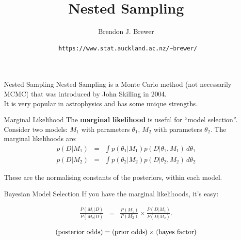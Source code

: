 \documentclass{beamer}
\title{Nested Sampling}
\author{Brendon J. Brewer}
\institute{Department of Statistics\\
The University of Auckland}
\date{{\tt \color{blue} https://www.stat.auckland.ac.nz/\~{ }brewer/}}
\begin{document}
\frame{\titlepage}


\begin{frame}[t]{Nested Sampling}
Nested Sampling is a Monte Carlo method (not necessarily MCMC) that was
introduced by John Skilling in 2004.\\
\vspace{20pt}
It is very popular in astrophysics and has some unique strengths.
\end{frame}


\begin{frame}[t]{Marginal Likelihood}
The {\bf marginal likelihood} is useful for ``model selection''. Consider
two models: $M_1$ with parameters $\theta_1$, $M_2$ with parameters $\theta_2$.
The marginal likelihoods are:
\begin{eqnarray*}
p(D | M_1) &=& \int p(\theta_1 | M_1) p(D | \theta_1, M_1) \, d\theta_1\\
p(D | M_2) &=& \int p(\theta_2 | M_2) p(D | \theta_2, M_2) \, d\theta_2
\end{eqnarray*}

These are the normalising constants of the posteriors, within each model.
\end{frame}


\begin{frame}[t]{Bayesian Model Selection}
If you have the marginal likelihoods, it's easy:

\begin{eqnarray*}
\frac{P(M_1 | D)}{P(M_2 | D)} &=& \frac{P(M_1)}{P(M_2)}
\times \frac{P(D | M_1)}{P(D | M_2)}.
\end{eqnarray*}

\begin{eqnarray*}
\textnormal{(posterior odds)} = \textnormal{(prior odds)} \times \textnormal{(bayes factor)}
\end{eqnarray*}

\end{frame}
\end{document}
